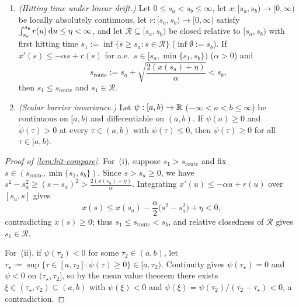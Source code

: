 \begin{lemma}
\label{lem:hit-compare}\leavevmode
\begin{enumerate}[label=(\roman*),leftmargin=*,itemsep=1pt,topsep=2pt]
\item \emph{(Hitting time under linear drift.)} Let $0 \le s_a < s_b \le \infty$, let $x : [s_a, s_b) \to [0, \infty)$ be locally absolutely continuous, let $r : [s_a, s_b) \to [0, \infty)$ satisfy $\int_{s_a}^{s_b} r(u)\,\mathrm{d} u \le \eta < \infty$, and let $\mathcal R \subseteq [s_a, s_b)$ be closed relative to $[s_a, s_b)$ with first hitting time $s_1 := \inf\{s \ge s_a : s \in \mathcal R\}$ ($\inf\emptyset := s_b$). If $x'(s) \le -\alpha s + r(s)$ for a.e.\ $s \in [s_a, \min\{s_1, s_b\})$ ($\alpha > 0$) and
\begin{equation}
  s_{\mathrm{route}} := s_a + \sqrt{\frac{2(x(s_a) + \eta)}{\alpha}} < s_b,
  \label{eq:s-route-general}
\end{equation}
then $s_1 \le s_{\mathrm{route}}$ and $s_1 \in \mathcal R$.
\item \emph{(Scalar barrier invariance.)} Let $\psi : [a, b) \to \mathbb R$ ($-\infty < a < b \le \infty$) be continuous on $[a, b)$ and differentiable on $(a, b)$. If $\psi(a) \ge 0$ and $\dot\psi(\tau) > 0$ at every $\tau \in (a, b)$ with $\psi(\tau) \le 0$, then $\psi(\tau) \ge 0$ for all $\tau \in [a, b)$.
\end{enumerate}
\end{lemma}
\begin{proof}[Proof of \cref{lem:hit-compare}]
For~(i), suppose $s_1 > s_{\mathrm{route}}$ and fix $s \in (s_{\mathrm{route}}, \min\{s_1, s_b\})$. Since $s > s_a \ge 0$, we have $s^2 - s_a^2 \ge (s - s_a)^2 > \frac{2(x(s_a)+\eta)}{\alpha}$. Integrating $x'(u) \le -\alpha u + r(u)$ over $[s_a, s]$ gives
\[
  x(s) \le x(s_a) - \frac{\alpha}{2}\bigl(s^2 - s_a^2\bigr) + \eta < 0,
\]
contradicting $x(s) \ge 0$; thus $s_1 \le s_{\mathrm{route}} < s_b$, and relative closedness of $\mathcal R$ gives $s_1 \in \mathcal R$.

For~(ii), if $\psi(\tau_2) < 0$ for some $\tau_2 \in (a, b)$, let $\tau_\star := \sup\{\tau \in [a, \tau_2] : \psi(\tau) \ge 0\} \in [a, \tau_2)$. Continuity gives $\psi(\tau_\star) = 0$ and $\psi < 0$ on $(\tau_\star, \tau_2]$, so by the mean value theorem there exists $\xi \in (\tau_\star, \tau_2) \subseteq (a, b)$ with $\psi(\xi) < 0$ and $\dot\psi(\xi) = \psi(\tau_2)/(\tau_2 - \tau_\star) < 0$, a contradiction.
\end{proof}


